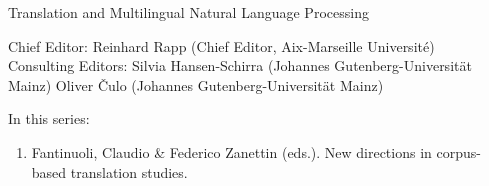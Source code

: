 {\large Translation and Multilingual Natural Language Processing}

\bigskip

Chief Editor: Reinhard Rapp (Chief Editor, Aix-Marseille Université) \\
Consulting Editors: Silvia Hansen-Schirra (Johannes Gutenberg-Universität Mainz)
Oliver Čulo (Johannes Gutenberg-Universität Mainz)

\bigskip

In this series:

\begin{enumerate}
\item Fantinuoli, Claudio \& Federico Zanettin (eds.). New directions in corpus-based translation studies.
\end{enumerate}